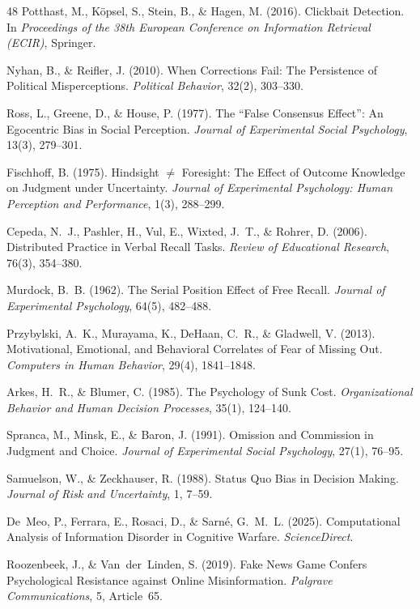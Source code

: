 \documentclass[11pt,a4paper]{article}
\begin{document}
\begin{thebibliography}{48}
Potthast, M., K\"opsel, S., Stein, B., \& Hagen, M. (2016). Clickbait Detection. In \textit{Proceedings of the 38th European Conference on Information Retrieval (ECIR)}, Springer.

Nyhan, B., \& Reifler, J. (2010). When Corrections Fail: The Persistence of Political Misperceptions. \textit{Political Behavior}, 32(2), 303--330.

Ross, L., Greene, D., \& House, P. (1977). The ``False Consensus Effect'': An Egocentric Bias in Social Perception. \textit{Journal of Experimental Social Psychology}, 13(3), 279--301.

Fischhoff, B. (1975). Hindsight $\neq$ Foresight: The Effect of Outcome Knowledge on Judgment under Uncertainty. \textit{Journal of Experimental Psychology: Human Perception and Performance}, 1(3), 288--299.

Cepeda, N.~J., Pashler, H., Vul, E., Wixted, J.~T., \& Rohrer, D. (2006). Distributed Practice in Verbal Recall Tasks. \textit{Review of Educational Research}, 76(3), 354--380.

Murdock, B.~B. (1962). The Serial Position Effect of Free Recall. \textit{Journal of Experimental Psychology}, 64(5), 482--488.

Przybylski, A.~K., Murayama, K., DeHaan, C.~R., \& Gladwell, V. (2013). Motivational, Emotional, and Behavioral Correlates of Fear of Missing Out. \textit{Computers in Human Behavior}, 29(4), 1841--1848.

Arkes, H.~R., \& Blumer, C. (1985). The Psychology of Sunk Cost. \textit{Organizational Behavior and Human Decision Processes}, 35(1), 124--140.

Spranca, M., Minsk, E., \& Baron, J. (1991). Omission and Commission in Judgment and Choice. \textit{Journal of Experimental Social Psychology}, 27(1), 76--95.

Samuelson, W., \& Zeckhauser, R. (1988). Status Quo Bias in Decision Making. \textit{Journal of Risk and Uncertainty}, 1, 7--59.

De~Meo, P., Ferrara, E., Rosaci, D., \& Sarn\'e, G.~M.~L. (2025). Computational Analysis of Information Disorder in Cognitive Warfare. \textit{ScienceDirect}.

Roozenbeek, J., \& Van~der~Linden, S. (2019). Fake News Game Confers Psychological Resistance against Online Misinformation. \textit{Palgrave Communications}, 5, Article~65.


\end{thebibliography}
\end{document}
